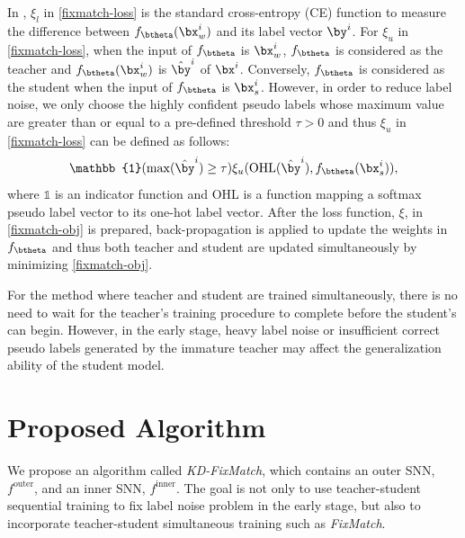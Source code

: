\documentclass{article}
\begin{document}
\par In \cite{KS20a}, $\xi_l$ in \eqref{fixmatch-loss} is the standard cross-entropy (CE) function to measure the difference between $f_{\btheta}(\bx^i_{w})$ and its label vector $\by^i$.
For $\xi_u$ in \eqref{fixmatch-loss},
when the input of $f_{\btheta}$ is $\bx^i_w$, $f_{\btheta}$ is considered as the teacher and
$f_{\btheta}(\bx^i_{w})$ is $\hat{\by}^i$ of $\bx^i$.
Conversely, $f_{\btheta}$ is considered as the student when the input of $f_{\btheta}$ is $\bx^i_s$.
However, in order to reduce label noise, we only choose the highly confident pseudo labels whose maximum value are greater than or equal to a pre-defined threshold $\tau > 0$
and thus $\xi_u$ in \eqref{fixmatch-loss} can be defined as follows:
\begin{equation}
\label{fixmatch-filter}
    \mathbb{1}(\max(\hat{\by}^i) \geq \tau )
      \xi_{u}(\text{OHL}(\hat{\by}^i), f_{\btheta}(\bx^i_{s})),
\end{equation}
where $\mathbb{1}$ is an indicator function and OHL is a function mapping a softmax pseudo label vector to its one-hot label vector.
After the loss function, $\xi$, in \eqref{fixmatch-obj} is prepared, back-propagation is applied to update the weights in $f_{\btheta}$ and thus
both teacher and student are updated simultaneously by minimizing \eqref{fixmatch-obj}.

For the method where teacher and student are trained simultaneously, there is no need to wait for the teacher's training procedure to complete before the student's can begin.
However, in the early stage, heavy label noise or insufficient correct pseudo labels
generated by the immature teacher may affect the generalization ability of the student model.

\section{Proposed Algorithm}
\label{sec:proposed-alg}

We propose an algorithm called {\sl KD-FixMatch}, which contains an outer SNN, $f^{\text{outer}}$, and an inner SNN, $f^{\text{inner}}$.
The goal is not only to use teacher-student sequential training to fix label noise problem in the early stage,
but also to incorporate teacher-student simultaneous training such as {\sl FixMatch}.
\end{document}
